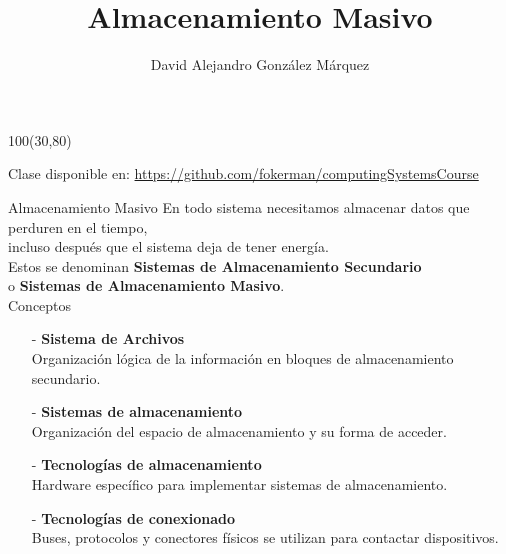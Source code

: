\documentclass[aspectratio=169]{beamer}
\title{\Huge Almacenamiento Masivo}
\author{David Alejandro González Márquez}
\date{}
\begin{document}
\begin{frame}[plain]
    \titlepage
    \begin{textblock}{100}(30,80)
    \begin{tcolorbox}[size=small,width=\textwidth,colback={gray!30},title={}]
    \begin{center}
     \scriptsize Clase disponible en: \url{https://github.com/fokerman/computingSystemsCourse}
    \end{center}
    \end{tcolorbox}
    \end{textblock}
\end{frame}

\begin{frame}{Almacenamiento Masivo}
    En todo sistema necesitamos almacenar datos que perduren en el tiempo,\\ incluso después que el sistema deja de tener energía.\\
    \bigskip
    Estos se denominan \textbf{Sistemas de Almacenamiento Secundario}\\ o \textbf{Sistemas de Almacenamiento Masivo}.\\
    \bigskip
    \pause
    \textcolor{naranjauca}{Conceptos}\\
    \small
    \begin{itemize}
    \item[-] \textbf{Sistema de Archivos}\\ Organización lógica de la información en bloques de almacenamiento secundario.
    \item[-] \textbf{Sistemas de almacenamiento}\\ Organización del espacio de almacenamiento y su forma de acceder.
    \item[-] \textbf{Tecnologías de almacenamiento}\\ Hardware específico para implementar sistemas de almacenamiento.
    \item[-] \textbf{Tecnologías de conexionado}\\ Buses, protocolos y conectores físicos se utilizan para contactar dispositivos.
    \end{itemize}
\end{frame}
\end{document}
